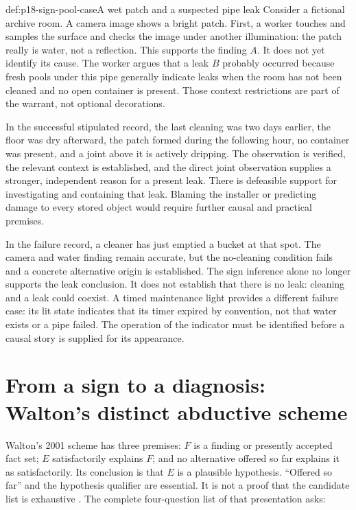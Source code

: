 \begin{hbexample}{def:p18-sign-pool-case}{A wet patch and a suspected pipe leak}
Consider a fictional archive room. A camera image shows a bright patch.
First, a worker touches and samples the surface and checks the image under
another illumination: the patch really is water, not a reflection. This
supports the finding \(A\). It does not yet identify its cause.
The worker argues that a leak \(B\) probably occurred because fresh pools
under this pipe generally indicate leaks when the room has not been cleaned
and no open container is present. Those context restrictions are part of
the warrant, not optional decorations.

In the successful stipulated record, the last cleaning was two days earlier,
the floor was dry afterward, the patch formed during the following hour,
no container was present, and a joint above it is actively dripping. The
observation is verified, the relevant context is established, and the direct
joint observation supplies a stronger, independent reason for a present leak.
There is defeasible support for investigating and containing that leak.
Blaming the installer or predicting damage to every stored object would
require further causal and practical premises.

In the failure record, a cleaner has just emptied a bucket at that spot.
The camera and water finding remain accurate, but the no-cleaning condition
fails and a concrete alternative origin is established. The sign inference
alone no longer supports the leak conclusion. It does not establish that
there is no leak: cleaning and a leak could coexist. A timed maintenance
light provides a different failure case: its lit state indicates that its
timer expired by convention, not that water exists or a pipe failed.
The operation of the indicator must be identified before a causal story
is supplied for its appearance.
\end{hbexample}

\section{From a sign to a diagnosis: Walton's distinct abductive scheme}
\label{sec:p18-sign-abductive-diagnosis}

Walton's 2001 scheme has three premises: \(F\) is a finding or presently
accepted fact set; \(E\) satisfactorily explains \(F\); and no alternative
offered so far explains it as satisfactorily. Its conclusion is that \(E\)
is a plausible hypothesis. ``Offered so far'' and the hypothesis qualifier
are essential. It is not a proof that the candidate list is exhaustive
\parencite[pp.~160--163]{Walton2001AbductivePresumptive}.
The complete four-question list of that presentation asks:

